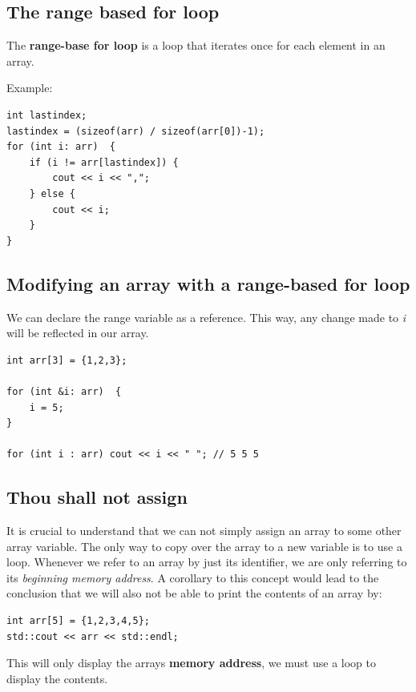 \documentclass{report}
\begin{document}
   \pagebreak \bigbreak \noindent 
   \subsection{The range based for loop}
   \bigbreak \noindent 
   \begin{concept}
 The \textbf{range-base for loop} is a loop that iterates once for each element in an array.
	\end{concept}
   \bigbreak \noindent 
   Example:
   \bigbreak \noindent 
   \sepline
    \begin{verbatim}
int lastindex;
lastindex = (sizeof(arr) / sizeof(arr[0])-1);
for (int i: arr)  {
    if (i != arr[lastindex]) {
        cout << i << ",";
    } else {
        cout << i;
    }
}
   \end{verbatim}
   \sepline

   \subsection{Modifying an array with a range-based for loop}
   \bigbreak \noindent 
   We can declare the range variable as a reference. This way, any change made to \textit{i} will be reflected in our array.
   \bigbreak \noindent 
   \sepline
   \begin{verbatim}
int arr[3] = {1,2,3};

for (int &i: arr)  {
    i = 5;
}

for (int i : arr) cout << i << " "; // 5 5 5
   \end{verbatim}
   \sepline

   \bigbreak \noindent 
   \subsection{Thou shall not assign}
   \bigbreak \noindent 
   It is crucial to understand  that we can not simply assign an array to some other array variable. The only way to copy over the array to a new variable is to use a loop. Whenever we refer to an array by just its identifier, we are only referring to its \textit{beginning memory address}.
   \bigbreak \noindent 
   A corollary to this concept would lead to the conclusion that we will also not be able to print the contents of an array by:
   \bigbreak \noindent 
   \sepline
   \begin{verbatim}
int arr[5] = {1,2,3,4,5};
std::cout << arr << std::endl;

   \end{verbatim}
   \sepline
   \bigbreak \noindent 
   This will only display the arrays \textbf{memory address}, we must use a loop to display the contents.
\end{document}
